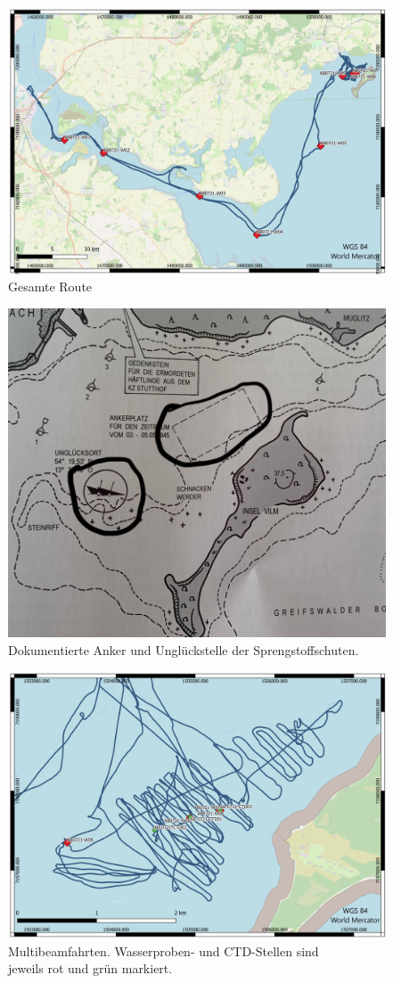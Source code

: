 \begin{figure}[]
    \centering
    \includegraphics[width=0.8\linewidth]{Bilder/QGIS/Gesamte_route.png}
    \caption{Gesamte Route}
    \label{fig:route}
\end{figure}
\begin{figure}[]
    \centering
    \includegraphics[width=0.8\linewidth]{Bilder/ungl.png}
    \caption{Dokumentierte Anker und Unglückstelle der Sprengstoffschuten.\cite{schiffsschicksale}}
    \label{fig:unglueck}
\end{figure}
\begin{figure}
    \centering
    \includegraphics[width=0.8\linewidth]{Bilder/QGIS/multibeam.png}
    \caption{Multibeamfahrten. Wasserproben- und CTD-Stellen sind\\jeweils rot und grün markiert.}
    \label{fig:multibeam_route}
\end{figure}

